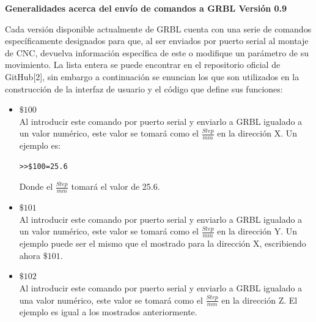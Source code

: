 \documentclass{article}
\begin{document}
\begin{multicols}{2}
\begin{center}
\textbf{Generalidades acerca del envío de comandos a GRBL Versión 0.9}
\end{center}
Cada versión disponible actualmente de GRBL cuenta con una serie de comandos específicamente designados para que, al ser enviados por puerto serial al montaje de CNC, devuelva información específica de este o modifique un parámetro de su movimiento. La lista entera se puede encontrar en el repositorio oficial de GitHub[2], sin embargo a continuación se enuncian los que son utilizados en la construcción de la interfaz de usuario y el código que define sus funciones:
\begin{itemize}
\item \textbf{$\$ 100$}\\
Al introducir este comando por puerto serial y enviarlo a GRBL igualado a un valor numérico, este valor se tomará como el $\frac{Step}{mm}$ en la dirección X. Un ejemplo es:
\begin{lstlisting}
>>$100=25.6
\end{lstlisting}
Donde el $\frac{Step}{mm}$ tomará el valor de 25.6.

\item \textbf{$\$ 101$}\\
Al introducir este comando por puerto serial y enviarlo a GRBL igualado a un valor numérico, este valor se tomará como el $\frac{Step}{mm}$ en la dirección Y. Un ejemplo puede ser el mismo que el mostrado para la dirección X, escribiendo ahora $\$ 101$.

\item \textbf{$\$ 102$}\\
Al introducir este comando por puerto serial y enviarlo a GRBL igualado a una valor numérico, este valor se tomará como el $\frac{Step}{mm}$ en la dirección Z. El ejemplo es igual a los mostrados anteriormente.
\end{itemize}


\end{multicols}
\end{document}
